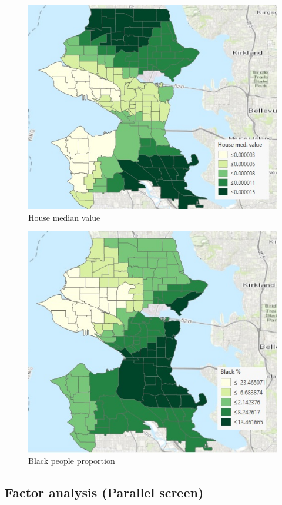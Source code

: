 \documentclass[]{article}
\begin{document}
\begin{figure}
\centering
\includegraphics{./Figs/H-value-w.jpg}
\caption{House median value}
\end{figure}

\begin{figure}
\centering
\includegraphics{./Figs/Black-w.jpg}
\caption{Black people proportion}
\end{figure}

\subsection{Factor analysis (Parallel
screen)}\label{factor-analysis-parallel-screen}
\end{document}
